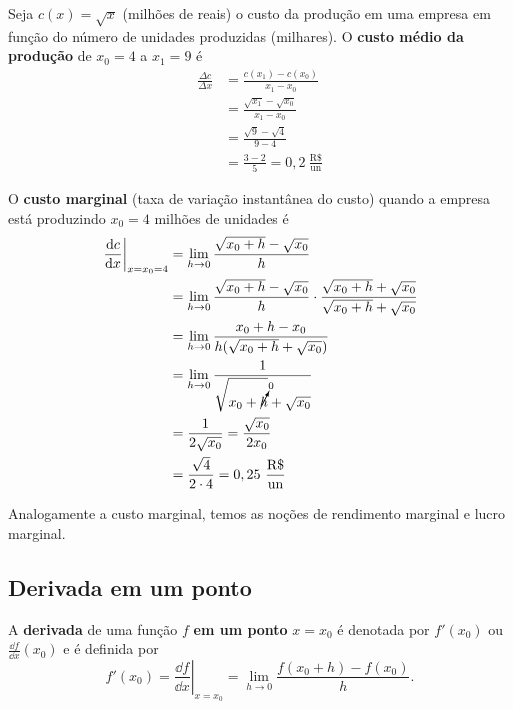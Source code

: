 \cleardoublepage\documentclass[../main.tex]{subfiles}
\begin{document}
\begin{ex}
  Seja $c(x) = \sqrt{x}$ (milhões de reais) o custo da produção em uma empresa em função do número de unidades produzidas (milhares). O {\bf custo médio da produção} de $x_0=4$ a $x_1=9$ é
  \begin{align*}
    \frac{\Delta c}{\Delta x} &= \frac{c(x_1)-c(x_0)}{x_1-x_0}\\
                              &= \frac{\sqrt{x_1}-\sqrt{x_0}}{x_1-x_0}\\
                              &= \frac{\sqrt{9}-\sqrt{4}}{9-4}\\
                              &= \frac{3-2}{5}= 0,2~\frac{\text{R\$}}{\text{un}}
  \end{align*}

  O {\bf custo marginal} (taxa de variação instantânea do custo) quando a empresa está produzindo $x_0=4$ milhões de unidades é
  \begin{align*}
    \left.\frac{\mathrm{d} c}{\mathrm{d} x}\right|_{x=x_0=4} &= \lim_{h\to 0} \frac{\sqrt{x_0+h}-\sqrt{x_0}}{h}\\
                                               &= \lim_{h\to 0} \frac{\sqrt{x_0+h}-\sqrt{x_0}}{h}\cdot \frac{\sqrt{x_0+h}+\sqrt{x_0}}{\sqrt{x_0+h}+\sqrt{x_0}}\\
                                               &= \lim_{h\to 0} \frac{x_0+h-x_0}{h(\sqrt{x_0+h}+\sqrt{x_0})}\\
                                               &= \lim_{h\to 0} \frac{1}{\sqrt{x_0+\cancelto{0}{h}}+\sqrt{x_0}}\\
                                               &= \frac{1}{2\sqrt{x_0}} = \frac{\sqrt{x_0}}{2x_0}\\
                                               &= \frac{\sqrt{4}}{2\cdot 4} = 0,25~\frac{\text{R\$}}{\text{un}}
  \end{align*}
\end{ex}

\begin{obs}
  Analogamente a custo marginal, temos as noções de rendimento marginal e lucro marginal.
\end{obs}

\subsection{Derivada em um ponto}

A {\bf derivada} de uma função $f$ {\bf em um ponto} $x=x_0$ é denotada por $f'(x_0)$ ou $\displaystyle \frac{\dd f}{\dd x}(x_0)$ e é definida por
\begin{equation}
  f'(x_0) = \left.\frac{\dd f}{\dd x}\right|_{x=x_0} = \lim_{h\to 0} \frac{f(x_0+h)-f(x_0)}{h}.
\end{equation}
\end{document}
